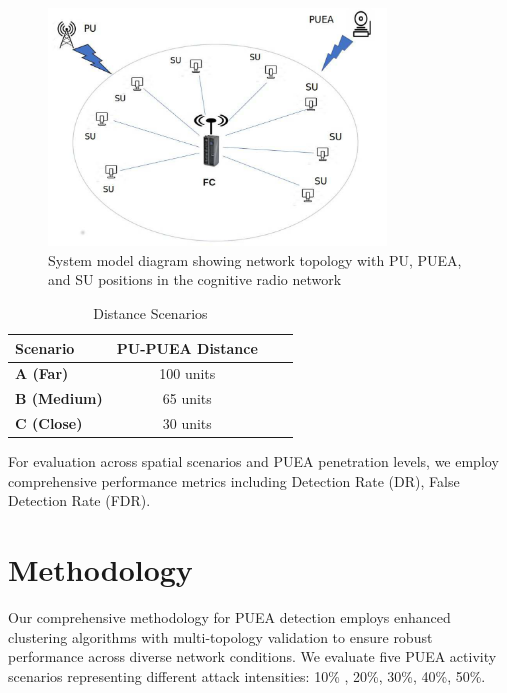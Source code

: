 \documentclass[pdflatex,sn-mathphys-num]{sn-jnl}%
\theoremstyle{thmstyleone}
\theoremstyle{thmstyletwo}
\theoremstyle{thmstylethree}
\begin{document}
\begin{figure}[!t]
\centering
\includegraphics[width=0.8\textwidth]{figures/sys model.png}
\caption{System model diagram showing network topology with PU, PUEA, and SU positions in the cognitive radio network}
\label{fig:network_topology}
\end{figure}



\begin{table}[!t]
\renewcommand{\arraystretch}{1.3}
\centering
\begin{tabular}{|l|c|c|c|}
\toprule
\textbf{Scenario} & \textbf{PU-PUEA Distance}\\
\midrule
\textbf{A (Far)} & 100 units\\
\midrule
\textbf{B (Medium)} & 65 units \\
\midrule
\textbf{C (Close)} & 30 units\\
\bottomrule
\end{tabular}
\vspace{0.2cm}
\caption{Distance Scenarios}
\label{tab:spatial_scenarios}
\end{table}

For evaluation across spatial scenarios and PUEA penetration levels, we employ comprehensive performance metrics including Detection Rate (DR), False Detection Rate (FDR).

\section{Methodology}\label{sec4}

Our comprehensive methodology for PUEA detection employs enhanced clustering algorithms with multi-topology validation to ensure robust performance across diverse network conditions. We evaluate five PUEA activity scenarios representing different attack intensities: 10\% , 20\%, 30\%, 40\%, 50\%.
\end{document}
